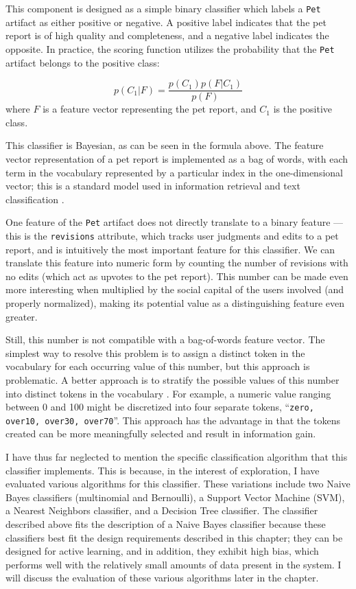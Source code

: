 This component is designed as a simple binary classifier which labels a {\tt Pet} artifact as either positive or negative.  A positive label indicates that the pet report is of high quality and completeness, and a negative label indicates the opposite.  In practice, the scoring function utilizes the probability that the {\tt Pet} artifact belongs to the positive class:

\[
	p(C_1 | F) = \frac{p(C_1)p(F | C_1)}{p(F)}
\]
where $F$ is a feature vector representing the pet report, and $C_1$ is the positive class.

This classifier is Bayesian, as can be seen in the formula above.  The feature vector representation of a pet report is implemented as a bag of words, with each term in the vocabulary represented by a particular index in the one-dimensional vector; this is a standard model used in information retrieval and text classification \cite{jurafsky:nlp, manning:ir}.  

One feature of the {\tt Pet} artifact does not directly translate to a binary feature --- this is the {\tt revisions} attribute, which tracks user judgments and edits to a pet report, and is intuitively the most important feature for this classifier.  We can translate this feature into numeric form by counting the number of revisions with no edits (which act as upvotes to the pet report).  This number can be made even more interesting when multiplied by the social capital of the users involved (and properly normalized), making its potential value as a distinguishing feature even greater.

Still, this number is not compatible with a bag-of-words feature vector.  The simplest way to resolve this problem is to assign a distinct token in the vocabulary for each occurring value of this number, but this approach is problematic.  A better approach is to stratify the possible values of this number into distinct tokens in the vocabulary \cite{macskassy:text}.  For example, a numeric value ranging between 0 and 100 might be discretized into four separate tokens, ``{\tt zero, over10, over30, over70}''.  This approach has the advantage in that the tokens created can be more meaningfully selected and result in information gain.

I have thus far neglected to mention the specific classification algorithm that this classifier implements.  This is because, in the interest of exploration, I have evaluated various algorithms for this classifier.  These variations include two Naive Bayes classifiers (multinomial and Bernoulli), a Support Vector Machine (SVM), a Nearest Neighbors classifier, and a Decision Tree classifier.  The classifier described above fits the description of a Naive Bayes classifier because these classifiers best fit the design requirements described in this chapter; they can be designed for active learning, and in addition, they exhibit high bias, which performs well with the relatively small amounts of data present in the system.  I will discuss the evaluation of these various algorithms later in the chapter.


